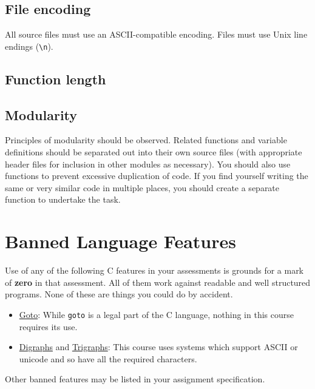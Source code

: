 \documentclass{article}
\begin{document}
\subsection{File encoding}
All source files must use an ASCII-compatible encoding. 
Files must use Unix line endings (\texttt{\textbackslash n}).

\subsection{Function length}


\subsection{Modularity}
Principles of modularity should be observed.
Related functions and variable definitions should be separated out into their own source files (with appropriate header files for inclusion in other modules as necessary).
You should also use functions to prevent excessive duplication of code.
If you find yourself writing the same or very similar code in multiple places, you should create a separate function to undertake the task.

\section{Banned Language Features}
Use of any of the following C features in your assessments is grounds for a mark of \textbf{zero} in that assessment.
All of them work against readable and well structured programs.
None of these are things you could do by accident.

\begin{itemize}
\item \underline{Goto}: While \texttt{goto} is a legal part of the C language, nothing in this course requires its use.
\item \underline{Digraphs} and \underline{Trigraphs}: This course uses systems which support ASCII or unicode and so have all the required characters.
\end{itemize}

\noindent Other banned features may be listed in your assignment specification.
\end{document}

